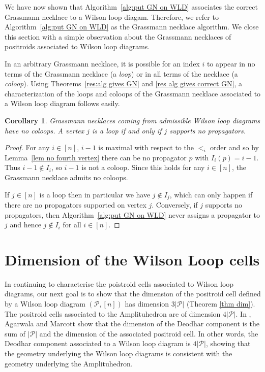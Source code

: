 \documentclass[11pt]{article}
\newcommand{\cP}{\mathcal{P}}
\newtheorem{cor}[thm]{Corollary}
\theoremstyle{remark}
\theoremstyle{definition}
\begin{document}
We have now shown that Algorithm~\ref{alg:put GN on WLD} associates the correct Grassmann necklace to a Wilson loop diagam. Therefore, we refer to Algorithm~\ref{alg:put GN on WLD} as the Grassmann necklace algorithm. We close this section with a simple observation about the Grassmann necklaces of positroids associated to Wilson loop diagrams.


In an arbitrary Grassmann necklace, it is possible for an index $i$ to appear in no terms of the Grassmann necklace (a {\em loop}) or in all terms of the necklace (a {\em coloop}). Using Theorems~\ref{res:alg gives GN} and \ref{res alg gives correct GN}, a characterization of the loops and coloops of the Grassmann necklace associated to a Wilson loop diagram follows easily.


\begin{cor}\label{no coloops}
Grassmann necklaces coming from admissible Wilson loop diagrams have no coloops. A vertex $j$ is a loop if and only if $j$ supports no propagators. 
\end{cor}
\begin{proof}
For any $i \in [n]$, $i-1$ is maximal with respect to the $<_{i}$ order and so by Lemma~\ref{lem no fourth vertex} there can be no propagator $p$ with $I_{i}(p) = i-1$. Thus $i-1 \not\in I_{i}$, so $i-1$ is not a coloop. Since this holds for any $i \in [n]$, the Grassmann necklace admits no coloops.

If $j \in [n]$ is a loop then in particular we have $j \not\in I_j$, which can only happen if there are no propagators supported on vertex $j$. Conversely, if $j$ supports no propagators, then Algorithm~\ref{alg:put GN on WLD} never assigns a propagator to $j$ and hence $j \not\in I_i$ for all $i \in [n]$.
\end{proof}





\section{Dimension of the Wilson Loop cells}\label{sec dim}

In continuing to characterise the poistroid cells associated to Wilson loop diagrams, our next goal is to show that the dimension of the positroid cell defined by a Wilson loop diagram $(\cP, [n])$ has dimension $3|\cP|$ (Theorem \ref{thm dim}).  The positroid cells associated to the Amplituhedron are of dimension $4|\cP|$. In \cite{non-orientable}, Agarwala and Marcott show that the dimension of the Deodhar component is the sum of $|\cP|$ and the dimension of the associated positroid cell.
In other words, the Deodhar component associated to a Wilson loop diagram is $4|\cP|$, showing that the geometry underlying the Wilson loop diagrams is consistent with the geometry underlying the Amplituhedron.
\end{document}
